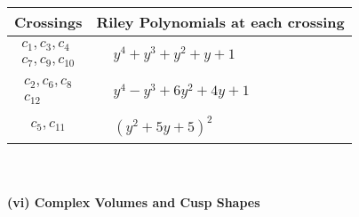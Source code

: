 \documentclass[1p]{elsarticle_modified}
\theoremstyle{definition}
\begin{document}
\begin{tabular}{m{50pt}|m{274pt}}
Crossings & \hspace{64pt}Riley Polynomials at each crossing \\
\hline $$\begin{aligned}c_{1},c_{3},c_{4}\\c_{7},c_{9},c_{10}\end{aligned}$$&$\begin{aligned}
&y^4+y^3+y^2+y+1
\end{aligned}$\\
\hline $$\begin{aligned}c_{2},c_{6},c_{8}\\c_{12}\end{aligned}$$&$\begin{aligned}
&y^4- y^3+6 y^2+4 y+1
\end{aligned}$\\
\hline $$\begin{aligned}c_{5},c_{11}\end{aligned}$$&$\begin{aligned}
&(y^2+5 y+5)^2
\end{aligned}$\\
\hline
\end{tabular}\\~\\
\newpage\flushleft \textbf{(vi) Complex Volumes and Cusp Shapes}
\end{document}
